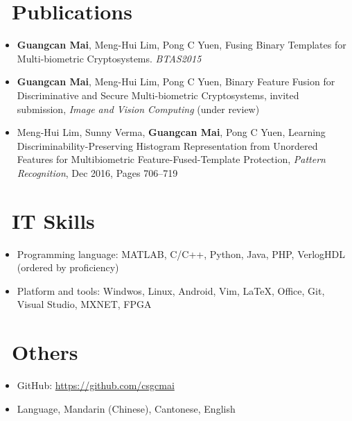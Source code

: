 \documentclass{resume}
\begin{document}
\section{\faBook\ Publications}
\begin{itemize}
	\item \textbf{Guangcan Mai}, Meng-Hui Lim, Pong C Yuen, Fusing Binary Templates for Multi-biometric Cryptosystems. \textit{BTAS2015}
	\item \textbf{Guangcan Mai}, Meng-Hui Lim, Pong C Yuen, Binary Feature Fusion for Discriminative and Secure Multi-biometric Cryptosystems, invited submission, \textit{Image and Vision Computing} (under review)
	\item Meng-Hui Lim, Sunny Verma, \textbf{Guangcan Mai}, Pong C Yuen, Learning Discriminability-Preserving Histogram Representation from Unordered Features for Multibiometric Feature-Fused-Template Protection, \textit{Pattern Recognition}, Dec 2016, Pages 706–719
\end{itemize}


\section{\faCogs\ IT Skills}
\begin{itemize}[parsep=0.5ex]
	\item Programming language: MATLAB, C/C++, Python, Java, PHP, VerlogHDL (ordered by proficiency)
	\item Platform and tools: Windwos, Linux, Android,  Vim, \LaTeX, Office, Git, Visual Studio, MXNET, FPGA
\end{itemize}

\section{\faInfo\ Others}
\begin{itemize}[parsep=0.5ex]
	\item GitHub: \url{https://github.com/csgcmai}
	\item Language, Mandarin (Chinese), Cantonese, English
\end{itemize}
\end{document}
